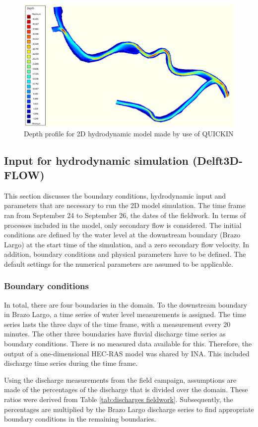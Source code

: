 \begin{figure}[H]
    \centering
    \includegraphics[width=0.5\linewidth]{figures/ch7/depthprofile.PNG}
    \caption{Depth profile for 2D hydrodynamic model made by use of QUICKIN}
    \label{fig:depthprofile}
\end{figure}



\subsection{Input for hydrodynamic simulation (Delft3D-FLOW)}
\label{sec:flow input}
This section discusses the boundary conditions, hydrodynamic input and parameters that are necessary to run the 2D model simulation. The time frame ran from September 24 to September 26, the dates of the fieldwork. In terms of processes included in the model, only secondary flow is considered. The initial conditions are defined by the water level at the downstream boundary (Brazo Largo) at the start time of the simulation, and a zero secondary flow velocity. In addition, boundary conditions and physical parameters have to be defined. The default settings for the numerical parameters are assumed to be applicable. 

\subsubsection{Boundary conditions}
In total, there are four boundaries in the domain. To the downstream boundary in Brazo Largo, a time series of water level measurements is assigned. The time series lasts the three days of the time frame, with a measurement every 20 minutes. The other three boundaries have fluvial discharge time series as boundary conditions. There is no measured data available for this. Therefore, the output of a one-dimensional HEC-RAS model was shared by INA. This included discharge time series during the time frame. 

Using the discharge measurements from the field campaign, assumptions are made of the percentages of the discharge that is divided over the domain. These ratios were derived from Table \ref{tab:discharges fieldwork}. Subsequently, the percentages are multiplied by the Brazo Largo discharge series to find appropriate boundary conditions in the remaining boundaries.

